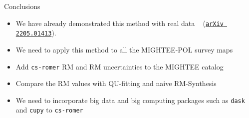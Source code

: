\documentclass[xetex,aspectratio=169]{beamer}
\begin{document}
\begin{frame}{Conclusions}
	\begin{itemize}
		\item We have already demonstrated this method with real data ~\parencite{a1314-csromer} (\href{https://arxiv.org/abs/2205.01413}{\texttt{arXiv 2205.01413}}).
		\item We need to apply this method to all the MIGHTEE-POL survey maps
		\item Add {\tt cs-romer} RM and RM uncertainties to the MIGHTEE catalog
		\item Compare the RM values with QU-fitting and naive RM-Synthesis
		\item We need to incorporate big data and big computing packages such as {\tt dask} and {\tt cupy} to {\tt cs-romer}
	\end{itemize}
\end{frame}
\end{document}
